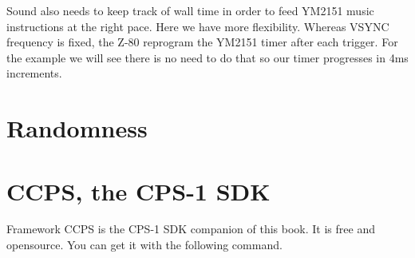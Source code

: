 Sound also needs to keep track of wall time in order to feed YM2151 music instructions at the right pace. Here we have more flexibility. Whereas VSYNC frequency is fixed,  the Z-80 reprogram the YM2151 timer after each trigger. For the example we will see there is no need to do that so our timer progresses in 4ms increments.

\section{Randomness}

\section{CCPS, the CPS-1 SDK}
Framework CCPS is the CPS-1 SDK companion of this book. It is free and opensource. You can get it with the following command.

